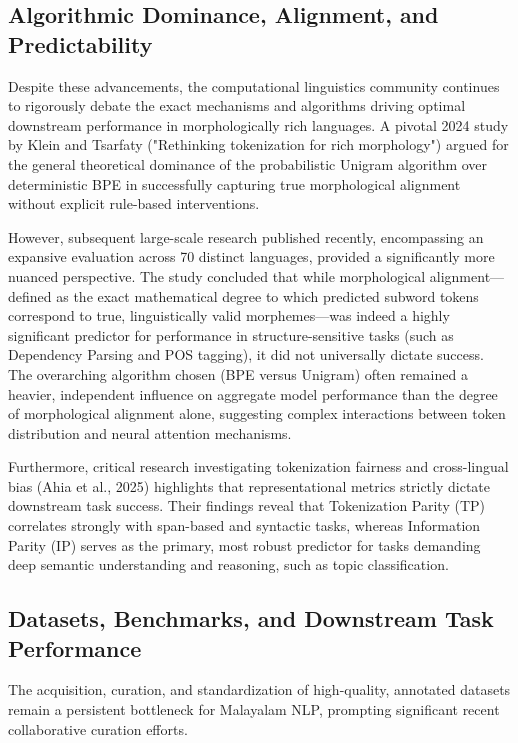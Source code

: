 \documentclass[12pt]{article}
\begin{document}
\subsection{Algorithmic Dominance, Alignment, and Predictability}

Despite these advancements, the computational linguistics community continues to rigorously debate the exact mechanisms and algorithms driving optimal downstream performance in morphologically rich languages. A pivotal 2024 study by Klein and Tsarfaty ("Rethinking tokenization for rich morphology") argued for the general theoretical dominance of the probabilistic Unigram algorithm over deterministic BPE in successfully capturing true morphological alignment without explicit rule-based interventions. 

However, subsequent large-scale research published recently, encompassing an expansive evaluation across 70 distinct languages, provided a significantly more nuanced perspective. The study concluded that while morphological alignment—defined as the exact mathematical degree to which predicted subword tokens correspond to true, linguistically valid morphemes—was indeed a highly significant predictor for performance in structure-sensitive tasks (such as Dependency Parsing and POS tagging), it did not universally dictate success. The overarching algorithm chosen (BPE versus Unigram) often remained a heavier, independent influence on aggregate model performance than the degree of morphological alignment alone, suggesting complex interactions between token distribution and neural attention mechanisms. 

Furthermore, critical research investigating tokenization fairness and cross-lingual bias (Ahia et al., 2025) highlights that representational metrics strictly dictate downstream task success. Their findings reveal that Tokenization Parity (TP) correlates strongly with span-based and syntactic tasks, whereas Information Parity (IP) serves as the primary, most robust predictor for tasks demanding deep semantic understanding and reasoning, such as topic classification. 

\subsection{Datasets, Benchmarks, and Downstream Task Performance}

The acquisition, curation, and standardization of high-quality, annotated datasets remain a persistent bottleneck for Malayalam NLP, prompting significant recent collaborative curation efforts. 
\end{document}
